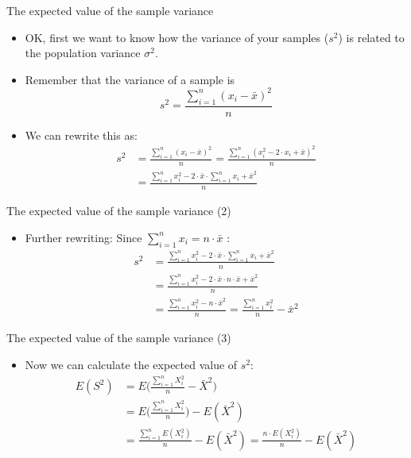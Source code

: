 \begin{frame}{The expected value of the sample variance}

\begin{itemize}
\itemsep1pt\parskip0pt
\item
  OK, first we want to know how the variance of your samples (\(s^2\))
  is related to the population variance \(\sigma^2\).
\item
  Remember that the variance of a sample is
  \[ s^2 = \frac{\sum\limits_{i=1}^{n}(x_i - \bar{x})^2}{n}\]
\item
  We can rewrite this as: \[
  \begin{aligned}
  s^2 &= \frac{\sum\limits_{i=1}^{n}(x_i - \bar{x})^2}{n} = \frac{\sum\limits_{i=1}^{n}(x_i^2 - 2\cdot x_i + \bar{x})^{2}}{n}\\
  &=\frac{\sum\limits_{i=1}^{n}x_i^2 - 2\cdot \bar{x} \cdot\sum\limits_{i=1}^{n}x_i + \bar{x}^{2}}{n}
  \end{aligned}
  \]
\end{itemize}

\end{frame}

\begin{frame}{The expected value of the sample variance (2)}

\begin{itemize}
\itemsep1pt\parskip0pt
\item
  Further rewriting: Since
  \(\sum\limits_{i=1}^{n} x_i = n \cdot \bar{x}\) : \[
  \begin{aligned}
  s^2 &=\frac{\sum\limits_{i=1}^{n}x_i^2 - 2\cdot \bar{x} \cdot\sum\limits_{i=1}^{n}x_i + \bar{x}^{2}}{n}\\
  &= \frac{\sum\limits_{i=1}^{n}x_i^2 - 2\cdot \bar{x} \cdot n \cdot \bar{x} + \bar{x}^{2}}{n}\\
  &= \frac{\sum\limits_{i=1}^{n}x_i^2 - n\cdot \bar{x}^2}{n} = \frac{\sum\limits_{i=1}^{n}x_i^2}{n} - \bar{x}^2
  \end{aligned}
  \]
\end{itemize}

\end{frame}

\begin{frame}{The expected value of the sample variance (3)}

\begin{itemize}
\itemsep1pt\parskip0pt
\item
  Now we can calculate the expected value of \(s^2\): \[
  \begin{aligned}
  E(S^2) &= E\Bigg(\frac{\sum\limits_{i=1}^{n}X_i^2}{n} - \bar{X}^2\Bigg) \\
     &= E\Bigg(\frac{\sum\limits_{i=1}^{n}X_i^2}{n}\Bigg) - E(\bar{X}^2) \\
     &= \frac{\sum\limits_{i=1}^{n}E(X_i^2)}{n} - E(\bar{X}^2) = \frac{n\cdot E(X_i^2)}{n}-E(\bar{X}^2)
  \end{aligned}
  \]
\end{itemize}

\end{frame}

